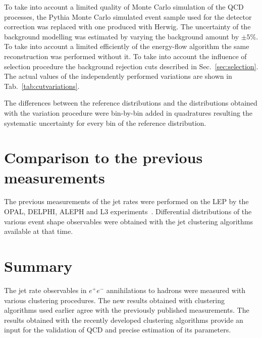  To take into account a limited quality of Monte Carlo simulation of the
 QCD processes, the Pythia Monte Carlo simulated event sample used for the detector
 correction was replaced with one produced with Herwig.
 The uncertainty of the background modelling was estimated by varying the 
 background amount by $\pm5\%$.
To take into account a limited efficiently of the energy-flow 
algorithm the same reconstruction was performed without it.
 To take into account the influence of selection procedure
the background rejection cuts described in Sec.~\ref{sec:selection}. %
 The actual values of the independently performed variations are shown in Tab.~\ref{tab:cutvariations}.
 \TABcutvariations
 
The differences between the reference distributions and the distributions obtained with 
the variation procedure were bin-by-bin added in quadratures resulting the systematic uncertainty for 
every bin of the reference distribution.
 


\section{Comparison to the previous measurements}                      
\label{sec:comparison}
The previous measurements of the jet rates were performed on the LEP by 
the OPAL, DELPHI, ALEPH and L3 experiments~\cite{Alexander:1996kh,
Ackerstaff:1997kk,Acton:1992fa,Akrawy:1989rg,Heister:2003aj,Abdallah:2003xz,Achard:2004sv}.
Differential distributions of the various event shape observables were 
obtained with the jet clustering algorithms available at that  time.
\section{Summary}                      
\label{sec:summary}
The jet rate observables  in $e^+e^-$ 
annihilations to hadrons were measured with various clustering procedures.
The new results obtained with 
clustering algorithms  used earlier agree with the previously published measurements.
The results obtained with the recently developed clustering algorithms  
provide an input for the validation of QCD and precise estimation of its parameters.
%
